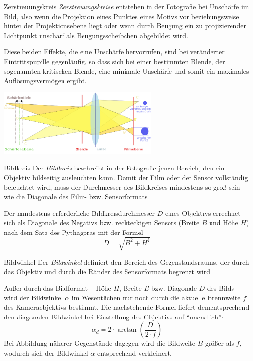 \begin{defi}{Zerstreuungskreis}
    \emph{Zerstreuungskreise} entstehen in der Fotografie bei Unschärfe im Bild, also wenn die Projektion eines Punktes eines Motivs vor beziehungsweise hinter der Projektionsebene liegt oder wenn durch Beugung ein zu projizierender Lichtpunkt unscharf als Beugungsscheibchen abgebildet wird.

    Diese beiden Effekte, die eine Unschärfe hervorrufen, sind bei veränderter Eintrittspupille gegenläufig, so dass sich bei einer bestimmten Blende, der sogenannten kritischen Blende, eine minimale Unschärfe und somit ein maximales Auflösungsvermögen ergibt.

    \centering
    \includegraphics[width=0.6\textwidth]{figures/zerstreuungskreis.png}
\end{defi}

\begin{defi}{Bildkreis}
    Der \emph{Bildkreis} beschreibt in der Fotografie jenen Bereich, den ein Objektiv bildseitig ausleuchten kann. Damit der Film oder der Sensor vollständig beleuchtet wird, muss der Durchmesser des Bildkreises mindestens so groß sein wie die Diagonale des Film- bzw. Sensorformats.

    Der mindestens erforderliche Bildkreisdurchmesser $D$ eines Objektivs errechnet sich als Diagonale des Negativs bzw. rechteckigen Sensors (Breite $B$ und Höhe $H$) nach dem Satz des Pythagoras mit der Formel
    \[
        D = \sqrt{B^2 + H^2}
    \]
\end{defi}

\begin{defi}{Bildwinkel}
    Der \emph{Bildwinkel} definiert den Bereich des Gegenstandsraums, der durch das Objektiv und durch die Ränder des Sensorformats begrenzt wird.

    Außer durch das Bildformat -- Höhe $H$, Breite $B$ bzw. Diagonale $D$ des Bilds -- wird der Bildwinkel $\alpha$ im Wesentlichen nur noch durch die aktuelle Brennweite $f$ des Kameraobjektivs bestimmt.
    Die nachstehende Formel liefert dementsprechend den diagonalen Bildwinkel bei Einstellung des Objektivs auf \enquote{unendlich}:
    \[
        \alpha_d = 2 \cdot \arctan \left( \frac{D}{2 \cdot f} \right)
    \]
    Bei Abbildung näherer Gegenstände dagegen wird die Bildweite $B$ größer als $f$, wodurch sich der Bildwinkel $\alpha$ entsprechend verkleinert.

\end{defi}

